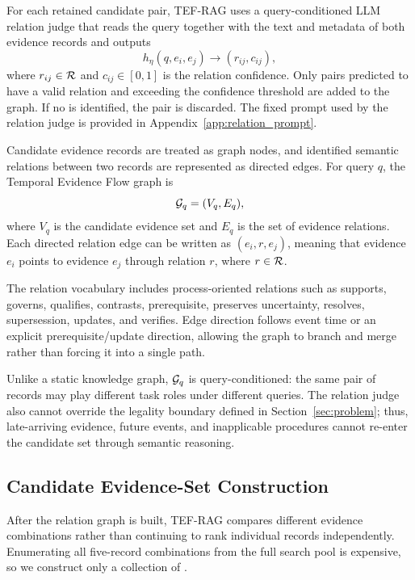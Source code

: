 For each retained candidate pair, TEF-RAG uses a query-conditioned LLM relation judge that reads the query together with the text and metadata of both evidence records and outputs
\begin{equation}
h_{\eta}(q,e_i,e_j)
\rightarrow
(r_{ij},c_{ij}),
\end{equation}
where $r_{ij}\in\mathcal{R}$ and $c_{ij}\in[0,1]$ is the relation confidence. Only pairs predicted to have a valid relation and exceeding the confidence threshold are added to the graph. %
If no  is identified, the pair is discarded. The fixed prompt used by the relation judge is provided in Appendix~\ref{app:relation_prompt}.

Candidate evidence records are treated as graph nodes, and identified semantic relations between two records are represented as directed edges. For query $q$, the Temporal Evidence Flow graph is
\begin{equation}
\mathcal{G}_q=(V_q,E_q),
\end{equation}
where $V_q$ is the candidate evidence set and $E_q$ is the set of evidence relations. Each directed relation edge can be written as $(e_i,r,e_j)$, meaning that evidence $e_i$ points to evidence $e_j$ through relation $r$, where $r\in\mathcal{R}$.

The relation vocabulary includes process-oriented relations such as supports, governs, qualifies, contrasts, prerequisite, preserves uncertainty, resolves, supersession, updates, and verifies. Edge direction follows event time or an explicit prerequisite/update direction, allowing the graph to branch and merge rather than forcing it into a single path.

Unlike a static knowledge graph, $\mathcal{G}_q$ is query-conditioned: the same pair of records may play different task roles under different queries. The relation judge also cannot override the legality boundary defined in Section~\ref{sec:problem}; thus, late-arriving evidence, future events, and inapplicable procedures cannot re-enter the candidate set through semantic reasoning.

\subsection{Candidate Evidence-Set Construction}

After the relation graph is built, TEF-RAG compares different evidence combinations rather than continuing to rank individual records independently. %
Enumerating all five-record combinations from the full search pool is expensive, so we construct only a collection of .

